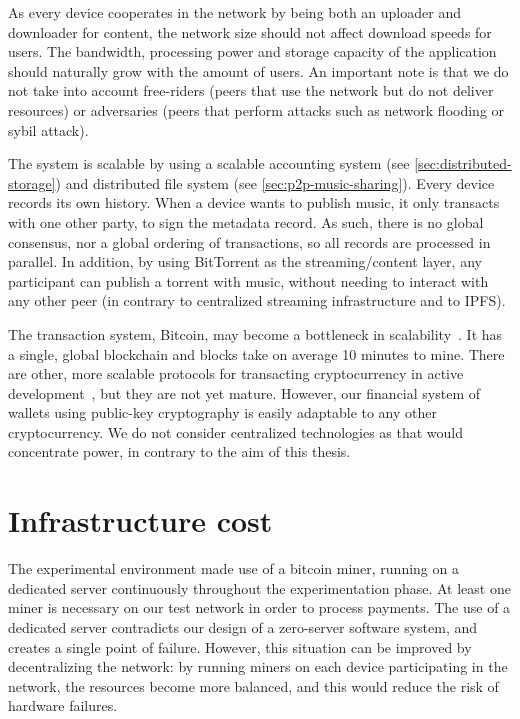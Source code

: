As every device cooperates in the network by being both an uploader and downloader for content, the network size should not affect download speeds for users. The bandwidth, processing power and storage capacity of the application should naturally grow with the amount of users. An important note is that we do not take into account free-riders (peers that use the network but do not deliver resources) or adversaries (peers that perform attacks such as network flooding or sybil attack).

The system is scalable by using a scalable accounting system (see \ref{sec:distributed-storage}) and distributed file system (see \ref{sec:p2p-music-sharing}). Every device records its own history. When a device wants to publish music, it only transacts with one other party, to sign the metadata record. As such, there is no global consensus, nor a global ordering of transactions, so all records are processed in parallel. In addition, by using BitTorrent as the streaming/content layer, any participant can publish a torrent with music, without needing to interact with any other peer (in contrary to centralized streaming infrastructure and to IPFS). 

The transaction system, Bitcoin, may become a bottleneck in scalability~\citep{chauhan2018blockchain}. It has a single, global blockchain and blocks take on average 10 minutes to mine. There are other, more scalable protocols for transacting cryptocurrency in active development~\citep{lemahieu2018nano}, but they are not yet mature. However, our financial system of wallets using public-key cryptography is easily adaptable to any other cryptocurrency. We do not consider centralized technologies as that would concentrate power, in contrary to the aim of this thesis.

\section{Infrastructure cost}
The experimental environment made use of a bitcoin miner, running on a dedicated server continuously throughout the experimentation phase. At least one miner is necessary on our test network in order to process payments. The use of a dedicated server contradicts our design of a zero-server software system, and creates a single point of failure. However, this situation can be improved by decentralizing the network: by running miners on each device participating in the network, the resources become more balanced, and this would reduce the risk of hardware failures.

